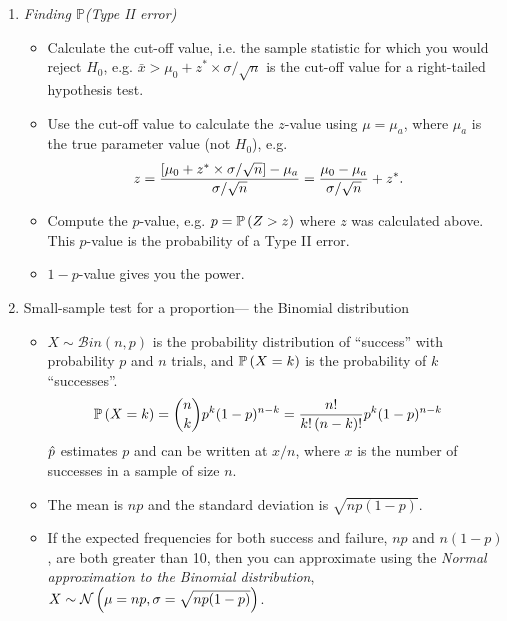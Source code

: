 \begin{enumerate}[label=\textbf{\S~\arabic*}, ref=\S~\arabic*]
\begin{enumerate}
        \item \textit{Finding $\mathbb{P}$(Type II error)}
        \begin{itemize}
            \item Calculate the cut-off value, i.e. the sample statistic for which you would reject $H_0$, e.g. $\bar{x}>\mu_0 + z^*\times \sigma/\sqrt{n}$ is the cut-off value for a right-tailed hypothesis test.
            \item Use the cut-off value to calculate the $z$-value using $\mu=\mu_a$, where $\mu_a$ is the true parameter value (not $H_0$), e.g.
            \begin{align*}
                z &= \frac{\left[ \mu_0 + z^*\times \sigma/\sqrt{n}\right] - \mu_a}{\sigma/\sqrt{n}} = \frac{\mu_0 - \mu_a}{\sigma/\sqrt{n}} + z^*.
            \end{align*}
            \item Compute the $p$-value, e.g. $p=\operatorname{\mathbb{P}}{\left( Z>z\right)}$ where $z$ was calculated above. This $p$-value is the probability of a Type II error.
            \item $1 -p$-value gives you the power. 
        \end{itemize}
        
        \item Small-sample test for a proportion— the Binomial distribution
        \begin{itemize}
            \item $X \sim \mathcal{B}in(n,p)$ is the probability distribution of ``success'' with probability $p$ and $n$ trials, and $\operatorname{\mathbb{P}}{\left( X=k\right)}$ is the probability of $k$ ``successes''. 
            \begin{align*}
                \operatorname{\mathbb{P}}{\left( X=k\right)} &= \binom{n}{k} p^k (1-p)^{n-k} = \frac{n!}{k!\left( n-k\right)!} p^k (1-p)^{n-k}
            \end{align*}
            $\Hat{p}$ estimates $p$ and can be written at $x/n$, where $x$ is the number of successes in a sample of size $n$. 
            \item The mean is $np$ and the standard deviation is $\sqrt{np(1-p)}$. 
            \item If the expected frequencies for both success and failure, $np$ and $n(1-p)$, are both greater than 10, then you can approximate using the \textit{Normal approximation to the Binomial distribution}, $X \sim \mathcal{N} \left( \mu=np, \sigma=\sqrt{np(1-p)}\right)$.
        \end{itemize}
    \end{enumerate}
    

\end{enumerate}
